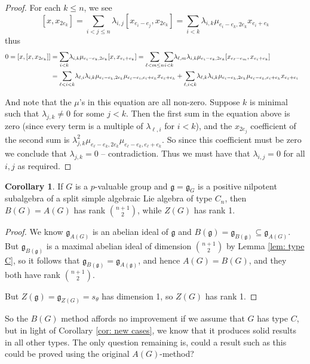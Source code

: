 \documentclass[12pt,a4paper]{article}
\let\\=\cr
\theoremstyle{definition}
\newtheorem{cor}[thm]{Corollary}
\theoremstyle{remark}
\theoremstyle{custthm}
\begin{document}
\begin{proof}
For each $k\leq n$, we see $$[x,x_{2e_k}]=\underset{i<j\leq n}{\sum}\lambda_{i,j}[x_{e_i-e_j},x_{2e_k}]=\underset{i< k}{\sum}\lambda_{i,k}\mu_{e_i-e_k,2e_k}x_{e_i+e_k}$$ thus 
\begin{align*}
0=[x,[x,x_{2e_k}]]&=\underset{i< k}{\sum}\lambda_{i,k}\mu_{e_i-e_k,2e_k}[x,x_{e_i+e_k}]=\underset{\ell<m\leq n}{\sum}\underset{i< k}{\sum}\lambda_{\ell,m}\lambda_{i,k}\mu_{e_i-e_k,2e_k}[x_{e_\ell-e_m},x_{e_i+e_k}]\\&=\underset{\ell<i<k}{\sum}\lambda_{\ell,i}\lambda_{i,k}\mu_{e_i-e_k,2e_k}\mu_{e_\ell-e_i,e_i+e_k}x_{e_\ell+e_k}+\underset{\ell,i<k}{\sum}\lambda_{\ell,k}\lambda_{i,k}\mu_{e_i-e_k,2e_k}\mu_{e_\ell-e_k,e_i+e_k}x_{e_\ell+e_i}
\end{align*}

And note that the $\mu$'s in this equation are all non-zero. Suppose $k$ is minimal such that $\lambda_{j,k}\neq 0$ for some $j<k$. Then the first sum in the equation above is zero (since every term is a multiple of $\lambda_{\ell,i}$ for $i<k$), and the $x_{2e_{j}}$ coefficient of the second sum is $\lambda_{j,k}^2\mu_{e_\ell-e_k,2e_k}\mu_{e_{\ell}-e_k,e_\ell+e_k}$. So since this coefficient must be zero we conclude that $\lambda_{j,k}=0$ -- contradiction. Thus we must have that $\lambda_{i,j}=0$ for all $i,j$ as required.\end{proof}

\begin{cor}\label{cor: type C}
If $G$ is a $p$-valuable group and $\mathfrak{g}=\mathfrak{g}_G$ is a positive nilpotent subalgebra of a split simple algebraic Lie algebra of type $C_n$, then $B(G)=A(G)$ has rank $\binom{n+1}{2}$, while $Z(G)$ has rank 1.
\end{cor}

\begin{proof}

We know $\mathfrak{g}_{A(G)}$ is an abelian ideal of $\mathfrak{g}$ and $B(\mathfrak{g})=\mathfrak{g}_{B(\mathfrak{g})}\subseteq\mathfrak{g}_{A(G)}$. But $\mathfrak{g}_{B(\mathfrak{g})}$ is a maximal abelian ideal of dimension $\binom{n+1}{2}$ by Lemma \ref{lem: type C}, so it follows that $\mathfrak{g}_{B(\mathfrak{g})}=\mathfrak{g}_{A(\mathfrak{g})}$, and hence $A(G)=B(G)$, and they both have rank $\binom{n+1}{2}$. 

But $Z(\mathfrak{g})=\mathfrak{g}_{Z(G)}=s_{\theta}$ has dimension 1, so $Z(G)$ has rank 1.\end{proof}

\noindent So the $B(G)$ method affords no improvement if we assume that $G$ has type $C$, but in light of Corollary \ref{cor: new cases}, we know that it produces solid results in all other types. The only question remaining is, could a result such as this could be proved using the original $A(G)$-method?\\
\end{document}
